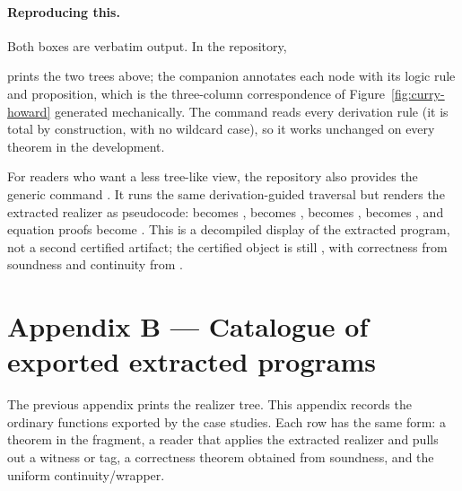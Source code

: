 \documentclass[11pt]{article}
\begin{document}
\paragraph{Reproducing this.} Both boxes are verbatim output. In the repository,

\begin{center}
\end{center}

\noindent
prints the two trees above; the companion  annotates each node
with its logic rule and proposition, which is the three-column correspondence of
Figure~\ref{fig:curry-howard} generated mechanically. The command reads every
derivation rule (it is total by construction, with no wildcard case), so it works
unchanged on every theorem in the development.

For readers who want a less tree-like view, the repository also provides the
generic command . It runs the same derivation-guided traversal
but renders the extracted realizer as pseudocode:  becomes
,  becomes ,
 becomes ,  becomes
, and equation proofs become . This is a
decompiled display of the extracted program, not a second certified artifact;
the certified object is still , with correctness from
soundness and continuity from .

\section{Appendix B --- Catalogue of exported extracted programs}
\label{app:catalogue}

The previous appendix prints the realizer tree. This appendix records the
ordinary functions exported by the case studies. Each row has the same form:
a theorem in the fragment, a reader that applies the extracted realizer and
pulls out a witness or tag, a correctness theorem obtained from soundness, and
the uniform continuity/\CtQ wrapper.
\end{document}
